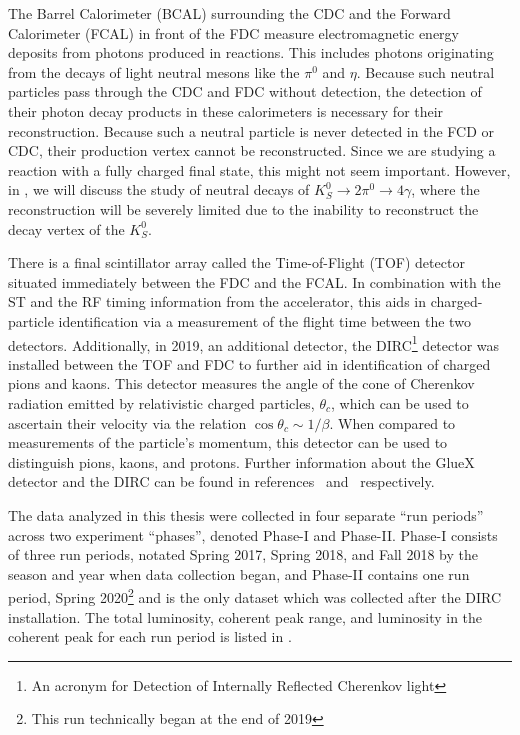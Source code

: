 The Barrel Calorimeter (BCAL) surrounding the CDC and the Forward Calorimeter (FCAL) in front of the FDC measure electromagnetic energy deposits from photons produced in reactions. This includes photons originating from the decays of light neutral mesons like the $\pi^0$ and $\eta$. Because such neutral particles pass through the CDC and FDC without detection, the detection of their photon decay products in these calorimeters is necessary for their reconstruction. Because such a neutral particle is never detected in the FCD or CDC, their production vertex cannot be reconstructed. Since we are studying a reaction with a fully charged final state, this might not seem important. However, in , we will discuss the study of neutral decays of $K_S^0\to 2\pi^0 \to 4\gamma$, where the reconstruction will be severely limited due to the inability to reconstruct the decay vertex of the $K_S^0$.

There is a final scintillator array called the Time-of-Flight (TOF) detector situated immediately between the FDC and the FCAL. In combination with the ST and the RF timing information from the accelerator, this aids in charged-particle identification via a measurement of the flight time between the two detectors. Additionally, in 2019, an additional detector, the DIRC\footnote{An acronym for Detection of Internally Reflected Cherenkov light} detector was installed between the TOF and FDC to further aid in identification of charged pions and kaons. This detector measures the angle of the cone of Cherenkov radiation emitted by relativistic charged particles, $\theta_c$, which can be used to ascertain their velocity via the relation $\cos\theta_c \sim 1/\beta$. When compared to measurements of the particle's momentum, this detector can be used to distinguish pions, kaons, and protons. Further information about the GlueX detector and the DIRC can be found in references~\cite{Adhikari2021} and~\cite{Ali2020} respectively.

The data analyzed in this thesis were collected in four separate ``run periods'' across two experiment ``phases'', denoted Phase-I and Phase-II. Phase-I consists of three run periods, notated Spring 2017, Spring 2018, and Fall 2018 by the season and year when data collection began, and Phase-II contains one run period, Spring 2020\footnote{This run technically began at the end of 2019} and is the only dataset which was collected after the DIRC installation. The total luminosity, coherent peak range, and luminosity in the coherent peak for each run period is listed in .


